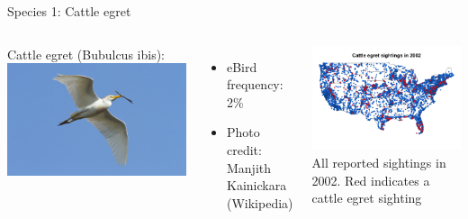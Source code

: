 \documentclass{beamer}
\begin{document}
\begin{frame}{Species 1: Cattle egret}
\begin{columns}[c]
  Cattle egret (Bubulcus ibis): \vspace{0.5em}
  \includegraphics[width=1\linewidth]{./plots/cattle_egret.jpg}
  \begin{itemize} \setlength{\itemsep}{0.5em}
    \item eBird frequency: 2\%
    \item \alert{Photo credit}: Manjith Kainickara (Wikipedia)
  \end{itemize}

  \includegraphics[width=1\linewidth]{./plots/cattle_egret.png}\\
  All reported sightings in 2002. \alert{Red} indicates a cattle egret sighting
\end{columns}
\end{frame}
\end{document}
